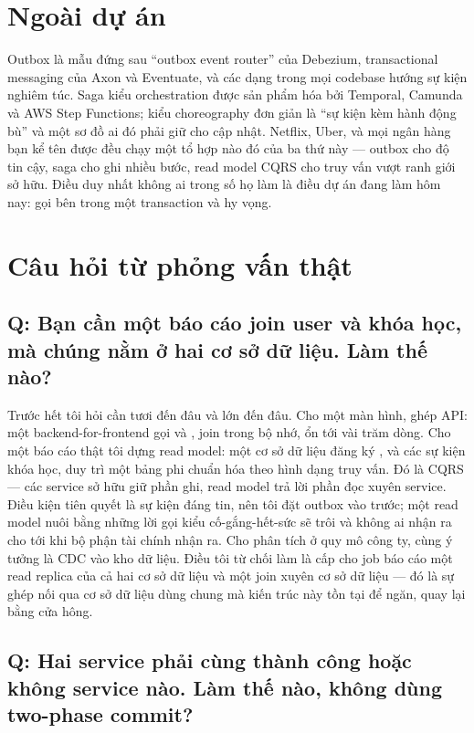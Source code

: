 \section{Ngoài dự án}

Outbox là mẫu đứng sau ``outbox event router'' của Debezium, transactional
messaging của Axon và Eventuate, và các dạng
 trong mọi codebase hướng sự kiện
nghiêm túc. Saga kiểu orchestration được sản phẩm hóa bởi Temporal,
Camunda và AWS Step Functions; kiểu choreography đơn giản là ``sự kiện
kèm hành động bù'' và một sơ đồ ai đó phải giữ cho cập nhật. Netflix,
Uber, và mọi ngân hàng bạn kể tên được đều chạy một tổ hợp nào đó của
ba thứ này --- outbox cho độ tin cậy, saga cho ghi nhiều bước, read
model CQRS cho truy vấn vượt ranh giới sở hữu. Điều duy nhất không ai
trong số họ làm là điều dự án đang làm hôm nay: gọi  bên
trong một transaction và hy vọng.

\section{Câu hỏi từ phỏng vấn thật}

\subsection*{Q: Bạn cần một báo cáo join user và khóa học, mà chúng nằm ở hai cơ sở dữ liệu. Làm thế nào?}

Trước hết tôi hỏi cần tươi đến đâu và lớn đến đâu. Cho một màn hình,
ghép API: một backend-for-frontend gọi  và
, join trong bộ nhớ, ổn tới vài trăm dòng. Cho một báo
cáo thật tôi dựng read model: một cơ sở dữ liệu  đăng
ký ,  và các sự kiện khóa
học, duy trì một bảng  phi chuẩn hóa theo hình
dạng truy vấn. Đó là CQRS --- các service sở hữu giữ phần ghi, read
model trả lời phần đọc xuyên service. Điều kiện tiên quyết là sự kiện
đáng tin, nên tôi đặt outbox vào trước; một read model nuôi bằng những
lời gọi  kiểu cố-gắng-hết-sức sẽ trôi và không ai nhận ra
cho tới khi bộ phận tài chính nhận ra. Cho phân tích ở quy mô công ty,
cùng ý tưởng là CDC vào kho dữ liệu. Điều tôi từ chối làm là cấp cho
job báo cáo một read replica của cả hai cơ sở dữ liệu và một join xuyên
cơ sở dữ liệu --- đó là sự ghép nối qua cơ sở dữ liệu dùng chung mà kiến
trúc này tồn tại để ngăn, quay lại bằng cửa hông.

\subsection*{Q: Hai service phải cùng thành công hoặc không service nào. Làm thế nào, không dùng two-phase commit?}

